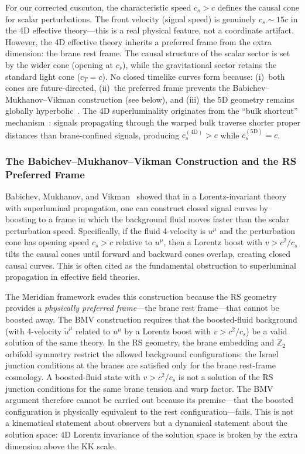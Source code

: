 For our corrected cuscuton, the characteristic speed $c_s > c$ defines the causal cone for scalar perturbations. The front velocity (signal speed) is genuinely $c_s \sim 15c$ in the 4D effective theory---this is a real physical feature, not a coordinate artifact. However, the 4D effective theory inherits a preferred frame from the extra dimension: the brane rest frame. The causal structure of the scalar sector is set by the wider cone (opening at $c_s$), while the gravitational sector retains the standard light cone ($c_T = c$). No closed timelike curves form because: (i)~both cones are future-directed, (ii)~the preferred frame prevents the Babichev--Mukhanov--Vikman construction (see below), and (iii)~the 5D geometry remains globally hyperbolic~\cite{ch5:Babichev2008}. The 4D superluminality originates from the ``bulk shortcut'' mechanism~\cite{ch5:ChungFreese2000}: signals propagating through the warped bulk traverse shorter proper distances than brane-confined signals, producing $c_s^{(4\mathrm{D})} > c$ while $c_s^{(5\mathrm{D})} = c$.

\subsubsection{The Babichev--Mukhanov--Vikman Construction and the RS Preferred Frame}

Babichev, Mukhanov, and Vikman~\cite{ch5:Babichev2008} showed that in a Lorentz-invariant theory with superluminal propagation, one can construct closed signal curves by boosting to a frame in which the background fluid moves faster than the scalar perturbation speed. Specifically, if the fluid 4-velocity is $u^\mu$ and the perturbation cone has opening speed $c_s > c$ relative to $u^\mu$, then a Lorentz boost with $v > c^2/c_s$ tilts the causal cones until forward and backward cones overlap, creating closed causal curves. This is often cited as the fundamental obstruction to superluminal propagation in effective field theories.

The Meridian framework evades this construction because the RS geometry provides a \emph{physically preferred frame}---the brane rest frame---that cannot be boosted away. The BMV construction requires that the boosted-fluid background (with 4-velocity $\tilde{u}^\mu$ related to $u^\mu$ by a Lorentz boost with $v > c^2/c_s$) be a valid solution of the same theory. In the RS geometry, the brane embedding and $\mathbb{Z}_2$ orbifold symmetry restrict the allowed background configurations: the Israel junction conditions at the branes are satisfied only for the brane rest-frame cosmology. A boosted-fluid state with $v > c^2/c_s$ is not a solution of the RS junction conditions for the same brane tension and warp factor. The BMV argument therefore cannot be carried out because its premise---that the boosted configuration is physically equivalent to the rest configuration---fails. This is not a kinematical statement about observers but a dynamical statement about the solution space: 4D Lorentz invariance of the solution space is broken by the extra dimension above the KK scale.

